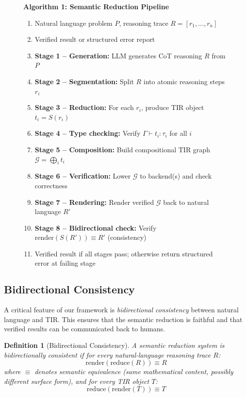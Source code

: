 \documentclass[11pt,a4paper]{article}
\newtheorem{definition}{Definition}
\begin{document}
\begin{figure}[h]
\centering
\small
\begin{minipage}{0.92\textwidth}
\textbf{Algorithm 1: Semantic Reduction Pipeline}
\label{alg:pipeline}
\begin{enumerate}[leftmargin=*,label=\textbf{\arabic*.},itemsep=2pt]
    \item[\textbf{Input:}] Natural language problem $P$, reasoning trace $R = [r_1, \dots, r_n]$
    \item[\textbf{Output:}] Verified result or structured error report
    \item \textbf{Stage 1 -- Generation:} LLM generates CoT reasoning $R$ from $P$
    \item \textbf{Stage 2 -- Segmentation:} Split $R$ into atomic reasoning steps $r_i$
    \item \textbf{Stage 3 -- Reduction:} For each $r_i$, produce TIR object $t_i = S(r_i)$
    \item \textbf{Stage 4 -- Type checking:} Verify $\Gamma \vdash t_i : \tau_i$ for all $i$
    \item \textbf{Stage 5 -- Composition:} Build compositional TIR graph $\mathcal{G} = \bigoplus_i t_i$
    \item \textbf{Stage 6 -- Verification:} Lower $\mathcal{G}$ to backend(s) and check correctness
    \item \textbf{Stage 7 -- Rendering:} Render verified $\mathcal{G}$ back to natural language $R'$
    \item \textbf{Stage 8 -- Bidirectional check:} Verify $\text{render}(S(R')) \equiv R'$ (consistency)
    \item[\textbf{Return:}] Verified result if all stages pass; otherwise return structured error at failing stage
\end{enumerate}
\end{minipage}
\end{figure}

\subsection{Bidirectional Consistency}
\label{sec:bidirectional}

A critical feature of our framework is \textit{bidirectional consistency} between natural language and TIR. This ensures that the semantic reduction is faithful and that verified results can be communicated back to humans.

\begin{definition}[Bidirectional Consistency]
A semantic reduction system is bidirectionally consistent if for every natural-language reasoning trace $R$:
\begin{equation}
\text{render}(\text{reduce}(R)) \equiv R
\end{equation}
where $\equiv$ denotes semantic equivalence (same mathematical content, possibly different surface form), and for every TIR object $T$:
\begin{equation}
\text{reduce}(\text{render}(T)) \equiv T
\end{equation}
\end{definition}
\end{document}
